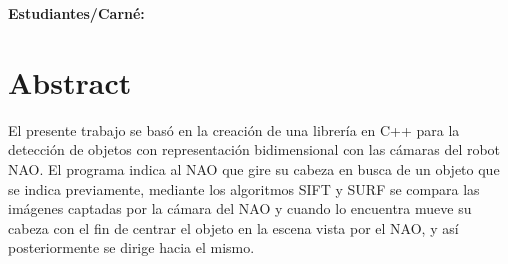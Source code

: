 \documentclass[letterpaper]{article}
\begin{document}
\vspace*{2cm}

\begin{center}
\Huge
{}
\vspace*{1cm}
\end{center}

\noindent
\small\baselineskip=14pt
\textbf{Estudiantes/Carné:} \\

\section{Abstract}
El presente trabajo se basó en la creación de una librería en C++ para la detección de objetos con representación bidimensional con las cámaras del robot NAO. El programa indica al NAO que gire su cabeza en busca de un objeto que se indica previamente, mediante los algoritmos SIFT y SURF se compara las imágenes captadas por la cámara del NAO y cuando lo encuentra mueve su cabeza con el fin de centrar el objeto en la escena vista por el NAO, y así posteriormente se dirige hacia el mismo.
\end{document}
